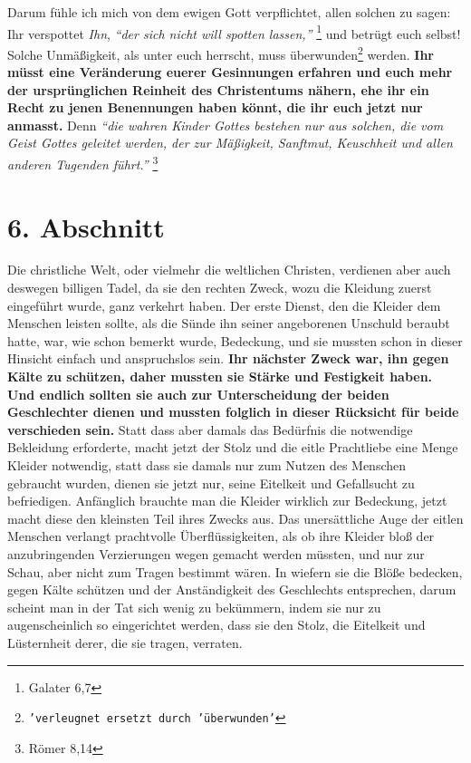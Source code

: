 \medskip

Darum fühle ich mich von dem ewigen Gott verpflichtet, allen solchen zu sagen:
Ihr verspottet \textit{Ihn},
\textit{"`der sich nicht will spotten lassen,"'}
\footnote{Galater 6,7}
und betrügt euch selbst! Solche Unmäßigkeit, als unter euch herrscht, muss
überwunden\footnote{\texttt{'verleugnet ersetzt durch 'überwunden'}} werden.
\label{ref:14_06_wahre_nachfolger_umkehr}
\textbf{Ihr müsst eine Veränderung euerer Gesinnungen erfahren und euch
mehr der ursprünglichen Reinheit des Christentums nähern, ehe ihr ein Recht zu
jenen Benennungen haben könnt, die ihr euch jetzt nur anmasst.}  Denn
\textit{"`die wahren
Kinder Gottes bestehen nur aus solchen, die vom Geist Gottes geleitet werden,
der zur Mäßigkeit, Sanftmut, Keuschheit und allen anderen Tugenden
führt."'}
\footnote{Römer 8,14}

\section{6. Abschnitt} \label{kap14_ab6}

Die christliche Welt, oder vielmehr die weltlichen Christen, 
verdienen aber auch
deswegen billigen Tadel, da sie den rechten Zweck, wozu die Kleidung zuerst
eingeführt wurde, ganz verkehrt haben. Der erste Dienst, den die Kleider dem
Menschen leisten sollte, als die Sünde ihn seiner angeborenen Unschuld beraubt
hatte, war, wie schon bemerkt wurde, Bedeckung, und sie mussten schon in dieser
Hinsicht einfach und anspruchslos sein. \textbf{Ihr nächster Zweck war, ihn gegen Kälte
zu schützen, daher mussten sie Stärke und Festigkeit haben. Und endlich sollten
sie auch zur Unterscheidung der beiden Geschlechter dienen und mussten folglich
in dieser Rücksicht für beide verschieden sein.} Statt dass aber 
damals das
Bedürfnis die notwendige Bekleidung erforderte, macht jetzt der Stolz und die
eitle Prachtliebe eine Menge Kleider notwendig, statt dass sie damals nur zum
Nutzen des Menschen gebraucht wurden, dienen sie jetzt nur, seine Eitelkeit und
Gefallsucht zu befriedigen. Anfänglich brauchte man die Kleider wirklich zur
Bedeckung, jetzt macht diese den kleinsten Teil ihres Zwecks aus. Das
unersättliche Auge der eitlen Menschen verlangt prachtvolle Überflüssigkeiten,
als ob ihre Kleider bloß der anzubringenden Verzierungen wegen gemacht werden
müssten, und nur zur Schau, aber nicht zum Tragen bestimmt wären. In wiefern sie
die Blöße bedecken, gegen Kälte schützen und der Anständigkeit des Geschlechts
entsprechen, darum scheint man in der Tat sich wenig zu bekümmern, indem
sie nur zu augenscheinlich so eingerichtet werden, dass sie den Stolz, die
Eitelkeit und Lüsternheit derer, die sie tragen, verraten.

